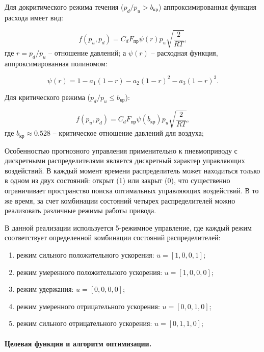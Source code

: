 Для докритического режима течения ($p_d/p_u > b_{\text{кр}}$) аппроксимированная функция расхода имеет вид:

\begin{equation}
	f(p_u, p_d) = C_d F_\text{пр} \psi(r) p_u \sqrt{\frac{2}{RT}},
\end{equation}
где $r = p_d/p_u$ -- отношение давлений;
а $\psi(r)$ -- расходная функция, аппроксимированная полиномом:

\begin{equation}
	\psi(r) = 1 - a_1(1-r) - a_2(1-r)^2 - a_3(1-r)^3.
\end{equation}

Для критического режима ($p_d/p_u \leq b_{\text{кр}}$):

\begin{equation}
	f(p_u, p_d) = C_d F_\text{пр} \psi(b_{\text{кр}}) p_u \sqrt{\frac{2}{RT}},
\end{equation}
где $b_{\text{кр}} \approx \num{0.528}$ -- критическое отношение давлений для воздуха;

Особенностью прогнозного управления применительно к пневмоприводу с дискретными
распределителями является дискретный характер управляющих воздействий. В каждый момент времени
распределитель может находиться только в одном из двух состояний: открыт (1) или закрыт (0), что
существенно ограничивает пространство поиска оптимальных управляющих воздействий.
В то же время, за счет комбинации состояний четырех распределителей можно реализовать различные режимы работы привода.

В данной реализации используется 5-режимное управление, где каждый режим
соответствует определенной комбинации состояний распределителей:

\begin{enumerate}
	\item режим сильного положительного ускорения: $u = [1, 0, 0, 1]$;
	\item режим умеренного положительного ускорения: $u = [1, 0, 0, 0]$;
	\item режим удержания: $u = [0, 0, 0, 0]$;
	\item режим умеренного отрицательного ускорения: $u = [0, 0, 1, 0]$;
	\item режим сильного отрицательного ускорения: $u = [0, 1, 1, 0]$;
\end{enumerate}

\paragraph*{Целевая функция и алгоритм оптимизации.}

